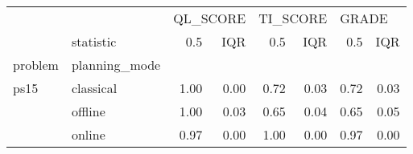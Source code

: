 \begin{tabular}{llrrrrrr}
\toprule
     & {} & \multicolumn{2}{l}{QL\_SCORE} & \multicolumn{2}{l}{TI\_SCORE} & \multicolumn{2}{l}{GRADE} \\
     & statistic &      0.5 &  IQR &      0.5 &  IQR &   0.5 &  IQR \\
problem & planning\_mode &          &      &          &      &       &      \\
\midrule
ps15 & classical &     1.00 & 0.00 &     0.72 & 0.03 &  0.72 & 0.03 \\
     & offline &     1.00 & 0.03 &     0.65 & 0.04 &  0.65 & 0.05 \\
     & online &     0.97 & 0.00 &     1.00 & 0.00 &  0.97 & 0.00 \\
\bottomrule
\end{tabular}
